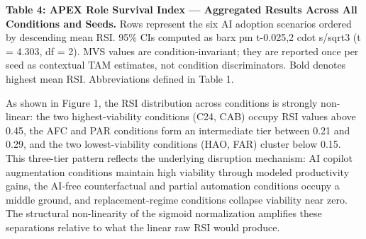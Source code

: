\documentclass[10pt, conference]{IEEEtran}
\begin{document}
\textbf{Table 4: APEX Role Survival Index --- Aggregated Results Across All Conditions and Seeds.} Rows represent the six AI adoption scenarios ordered by descending mean RSI. 95\% CIs computed as barx pm t-0.025,2 cdot s/sqrt3 (t = 4.303, df = 2). MVS values are condition-invariant; they are reported once per seed as contextual TAM estimates, not condition discriminators. Bold denotes highest mean RSI. Abbreviations defined in Table 1.

\begin{table}[ht]
\centering
\caption{Comparison of Abbrev. across Descriptive Name, RSI Mean, RSI Std, 95\% CI}
\label{tab:4}
\end{table}

As shown in Figure 1, the RSI distribution across conditions is strongly non-linear: the two highest-viability conditions (C24, CAB) occupy RSI values above 0.45, the AFC and PAR conditions form an intermediate tier between 0.21 and 0.29, and the two lowest-viability conditions (HAO, FAR) cluster below 0.15. This three-tier pattern reflects the underlying disruption mechanism: AI copilot augmentation conditions maintain high viability through modeled productivity gains, the AI-free counterfactual and partial automation conditions occupy a middle ground, and replacement-regime conditions collapse viability near zero. The structural non-linearity of the sigmoid normalization amplifies these separations relative to what the linear raw RSI would produce.
\end{document}
